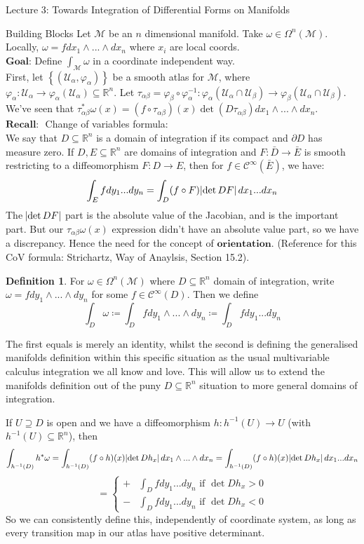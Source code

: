 \documentclass[10pt]{article}
\theoremstyle{plain}
\theoremstyle{definition}
\newtheorem{defn}[thm]{Definition} %
\newcommand{\Recall}{\textbf{Recall: }}
\newcommand{\Real}{\mathbb{R}}
\newcommand{\man}{\mathcal{M}}
\newcommand{\chartU}{\mathcal{U}}
\newcommand{\chart}{\varphi}
\newcommand{\alphaatlas}{\left\{(\chartU_\alpha,\chart_\alpha)\right\}}
\newcommand{\trans}{\tau_{\alpha\beta}}
\newcommand{\allthewedge}[3]{{#1}_{#2}\wedge...\wedge{#1}_{#3}}
\newcommand{\pformman}[1]{\Omega^{#1}(\man)}
\newcommand{\dx}{dx}
\newcommand{\dy}{dy}
\newcommand{\cts}[1]{\mathcal{C}^{\infty}(#1)}
\begin{document}
\begin{section}{Lecture 3: Towards Integration of Differential Forms on Manifolds}
\begin{subsection}{Building Blocks}
Let $\man$ be an $n$ dimensional manifold. Take $\omega\in\pformman{n}$. Locally, $\omega = f \allthewedge{\dx}{1}{n}$ where $x_i$ are local coords.\\
$\textbf{Goal:}$ Define $\int_\man \omega$ in a coordinate independent way.
\\
First, let $\alphaatlas$ be a smooth atlas for $\man$, where $\chart _\alpha : \chartU_\alpha \to \chart_\alpha(\chartU_\alpha) \subseteq\Real^n$. Let $\trans = \chart_\beta\circ\chart_\alpha^{-1} : \chart_\alpha(\chartU_\alpha\cap \chartU_\beta)\to \chart_\beta(\chartU_\alpha\cap \chartU_\beta)$. We've seen that $\tau_{\alpha\beta}^*\omega(x) = (f\circ \trans)(x) \det(D\trans)\allthewedge{\dx}{1}{n}$.
\\
$\Recall$ Change of variables formula:\\
We say that $D \subseteq\Real^n$ is a domain of integration if its compact and $\partial D$ has measure zero. If $D,E\subseteq\Real^n$ are domains of integration and $F:\bar{D}\to\bar{E}$ is smooth restricting to a diffeomorphism $F : D\to E$, then for $f\in\cts{\bar{E}}$, we have:\\
$$\int_E f \dy_1 ... \dy_n = \int_D (f\circ F) \abs{\det DF} \dx_1 ... \dx_n$$
The  $ \abs{\det DF}$ part is the absolute value of the Jacobian, and is the important part. But our $\trans \omega(x)$ expression didn't have an absolute value part, so we have a discrepancy. Hence the need for the concept of $\textbf{orientation}.$ (Reference for this CoV formula: Strichartz, Way of Anaylsis, Section 15.2).
\begin{defn}

For $\omega \in \pformman{n}$ where $D\subseteq\Real^n$ domain of integration, write $\omega = f \allthewedge{\dy}{1}{n}$ for some $f\in \cts{D}$. Then we define 
$$\int_D \omega \coloneqq \int_D f \allthewedge{\dy}{1}{n} \coloneqq \int_D f \dy_1...\dy_n $$
\end{defn}
The first equals is merely an identity, whilst the second is defining the generalised manifolds definition within this specific situation as the usual multivariable calculus integration we all know and love. This will allow us to extend the manifolds definition out of the puny $D\subseteq\Real^n$ situation to more general domains of integration.

If $U\supseteq D$ is open and we have a diffeomorphism $h: h^{-1}(U)\to U $ (with $h^{-1}(U)\subseteq \Real^n$), then
$$
\int_{h^{-1}(D)} h^* \omega = \int_{h^{-1}(D)} (f\circ h)(x) \abs{\det Dh_x} \allthewedge{\dx}{1}{n} = \int_{h^{-1}(D)} (f\circ h)(x) \abs{\det Dh_x} \dx_1 ...\dx_n 
$$$$
=\begin{cases}
+&\int_D f \dy_1 ... \dy_n \text{  if } \det Dh_x > 0 \\
 - &\int_D f \dy_1 ... \dy_n \text{  if } \det Dh_x < 0
\end{cases}$$
So we can consistently define this, independently of coordinate system, as long as every transition map in our atlas have positive determinant.


\end{subsection}
\end{section}
\end{document}
